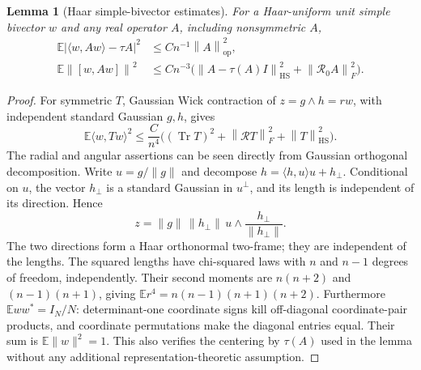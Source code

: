 \documentclass[11pt]{article}
\newtheorem{lemma}[theorem]{Lemma}
\theoremstyle{definition}\newtheorem{definition}[theorem]{Definition}
\theoremstyle{remark}\newtheorem{remark}[theorem]{Remark}
\DeclareMathOperator{\Tr}{Tr}
\newcommand{\E}{\mathbb E}
\newcommand{\R}{\mathcal R}
\newcommand{\op}{\mathrm{op}}
\newcommand{\HS}{\mathrm{HS}}
\newcommand{\ip}[2]{\langle#1,#2\rangle}
\newcommand{\norm}[1]{\left\lVert#1\right\rVert}
\begin{document}
\begin{lemma}[Haar simple-bivector estimates]\label{lem:haar}
For a Haar-uniform unit simple bivector $w$ and any real operator $A$, including nonsymmetric $A$,
\begin{align}
 \E|\ip w{Aw}-\tau A|^2&\le Cn^{-1}\norm A_{\op}^2,\label{eq:haar-variance}\\
 \E\norm{[w,Aw]}^2&\le Cn^{-3}
 \bigl(\norm{A-\tau(A)I}_{\HS}^2+\norm{\R_0A}_F^2\bigr).
 \label{eq:haar-commutator}
\end{align}
\end{lemma}
\begin{proof}
For symmetric $T$, Gaussian Wick contraction of $z=g\wedge h=rw$, with independent standard Gaussian $g,h$, gives
\begin{equation}\label{eq:fourth-moment}
 \E\ip w{Tw}^2\le\frac C{n^4}
 \bigl((\Tr T)^2+\norm{\R T}_F^2+\norm T_{\HS}^2\bigr).
\end{equation}
The radial and angular assertions can be seen directly from Gaussian orthogonal decomposition. Write $u=g/\|g\|$ and decompose $h=\langle h,u\rangle u+h_\perp$. Conditional on $u$, the vector $h_\perp$ is a standard Gaussian in $u^\perp$, and its length is independent of its direction. Hence
\[
 z=\|g\|\,\|h_\perp\|\,
       u\wedge\frac{h_\perp}{\|h_\perp\|}.
\]
The two directions form a Haar orthonormal two-frame; they are independent of the lengths. The squared lengths have chi-squared laws with $n$ and $n-1$ degrees of freedom, independently. Their second moments are $n(n+2)$ and $(n-1)(n+1)$, giving
$\E r^4=n(n-1)(n+1)(n+2)$.
Furthermore $\E ww^*=I_N/N$: determinant-one coordinate signs kill off-diagonal coordinate-pair products, and coordinate permutations make the diagonal entries equal. Their sum is $\E\|w\|^2=1$. This also verifies the centering by $\tau(A)$ used in the lemma without any additional representation-theoretic assumption.


\end{proof}
\end{document}
